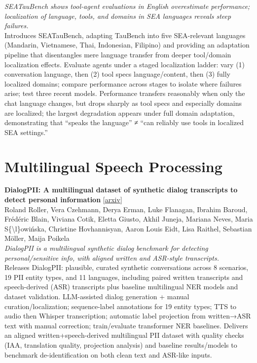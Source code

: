 \documentclass[12pt,letterpaper]{article}
\begin{document}
{\small\textit{SEATauBench shows tool-agent evaluations in English overestimate performance; localization of language, tools, and domains in SEA languages reveals steep failures.}}\\[1pt]
{\footnotesize Introduces SEATauBench, adapting TauBench into five SEA-relevant languages (Mandarin, Vietnamese, Thai, Indonesian, Filipino) and providing an adaptation pipeline that disentangles mere language transfer from deeper tool/domain localization effects. Evaluate agents under a staged localization ladder: vary (1) conversation language, then (2) tool specs language/content, then (3) fully localized domains; compare performance across stages to isolate where failures arise; test three recent models. Performance transfers reasonably when only the chat language changes, but drops sharply as tool specs and especially domains are localized; the largest degradation appears under full domain adaptation, demonstrating that ``speaks the language'' ≠ ``can reliably use tools in localized SEA settings.''}

\medskip


\section*{Multilingual Speech Processing}

{\small\textbf{DialogPII: A multilingual dataset of synthetic dialog transcripts to detect personal information}} {\scriptsize[\href{https://arxiv.org/abs/2606.30312}{arxiv}]}\\
{\scriptsize Roland Roller, Vera Czehmann, Derya Erman, Luke Flanagan, Ibrahim Baroud, Fr\'ed\'eric Blain, Viviana Cotik, Eletta Giusto, Akhil Juneja, Mariana Neves, Maria S\{\textbackslash{}l\}owi\'nska, Christine Hovhannisyan, Aaron Louis Eidt, Lisa Raithel, Sebastian M\"oller, Maija Poikela}\\

{\small\textit{DialogPII is a multilingual synthetic dialog benchmark for detecting personal/sensitive info, with aligned written and ASR-style transcripts.}}\\[1pt]
{\footnotesize Releases DialogPII: plausible, curated synthetic conversations across 8 scenarios, 19 PII entity types, and 11 languages, including paired written transcripts and speech-derived (ASR) transcripts plus baseline multilingual NER models and dataset validation. LLM-assisted dialog generation + manual curation/localization; sequence-label annotations for 19 entity types; TTS to audio then Whisper transcription; automatic label projection from written→ASR text with manual correction; train/evaluate transformer NER baselines. Delivers an aligned written+speech-derived multilingual PII dataset with quality checks (IAA, translation quality, projection analysis) and baseline results/models to benchmark de-identification on both clean text and ASR-like inputs.}
\end{document}
